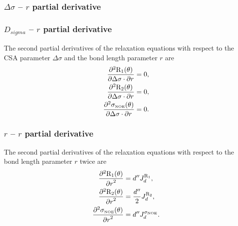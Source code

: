 \begin{latexonly}
    \subsubsection{$\Delta\sigma$ -- $r$ partial derivative}
\end{latexonly}
\begin{htmlonly}
    \subsubsection{$D_{sigma}$ -- $r$ partial derivative}
\end{htmlonly}

The second partial derivatives of the relaxation equations with respect to the CSA parameter $\Delta\sigma$ and the bond length parameter $r$ are
\begin{subequations}
\begin{align}
    \frac{\partial^2 \mathrm{R}_1(\theta)}{\partial \Delta\sigma \cdot \partial r} &= 0,         \label{eq: Ri': d2R1/dCSA.dr} \\
    \frac{\partial^2 \mathrm{R}_2(\theta)}{\partial \Delta\sigma \cdot \partial r} &= 0,         \label{eq: Ri': d2R2/dCSA.dr} \\
    \frac{\partial^2 \sigma_{\scriptscriptstyle \mathrm{NOE}}(\theta)}{\partial \Delta\sigma \cdot \partial r} &= 0.  \label{eq: Ri': d2sigmaNOE/dCSA.dr}
\end{align}
\end{subequations}


\subsubsection{$r$ -- $r$ partial derivative}

The second partial derivatives of the relaxation equations with respect to the bond length parameter $r$ twice are
\begin{subequations}
\begin{align}
    \frac{\partial^2 \mathrm{R}_1(\theta)}{{\partial r}^2} &= d'' J_d^{\mathrm{R}_1},                 \label{eq: Ri': d2R1/dr2} \\
    \frac{\partial^2 \mathrm{R}_2(\theta)}{{\partial r}^2} &= \frac{d''}{2} J_d^{\mathrm{R}_2},       \label{eq: Ri': d2R2/dr2} \\
    \frac{\partial^2 \sigma_{\scriptscriptstyle \mathrm{NOE}}(\theta)}{{\partial r}^2} &= d'' J_d^{\sigma_{\scriptscriptstyle \mathrm{NOE}}}.   \label{eq: Ri': d2sigmaNOE/dr2}
\end{align}
\end{subequations}




